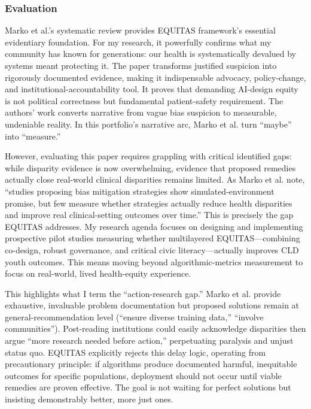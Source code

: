 \documentclass[11pt,twoside]{article}
\begin{document}
\vspace{-0.3cm}

\subsubsection*{Evaluation}

\vspace{-0.3cm}

Marko et al.'s systematic review provides EQUITAS framework's essential evidentiary foundation. For my research, it powerfully confirms what my community has known for generations: our health is systematically devalued by systems meant protecting it. The paper transforms justified suspicion into rigorously documented evidence, making it indispensable advocacy, policy-change, and institutional-accountability tool. It proves that demanding AI-design equity is not political correctness but fundamental patient-safety requirement. The authors' work converts narrative from vague bias suspicion to measurable, undeniable reality. In this portfolio's narrative arc, Marko et al. turn ``maybe'' into ``measure.''

However, evaluating this paper requires grappling with critical identified gaps: while disparity evidence is now overwhelming, evidence that proposed remedies actually close real-world clinical disparities remains limited. As Marko et al. note, ``studies proposing bias mitigation strategies show simulated-environment promise, but few measure whether strategies actually reduce health disparities and improve real clinical-setting outcomes over time.'' This is precisely the gap EQUITAS addresses. My research agenda focuses on designing and implementing prospective pilot studies measuring whether multilayered EQUITAS---combining co-design, robust governance, and critical civic literacy---actually improves CLD youth outcomes. This means moving beyond algorithmic-metrics measurement to focus on real-world, lived health-equity experience.

This highlights what I term the ``action-research gap.'' Marko et al. provide exhaustive, invaluable problem documentation but proposed solutions remain at general-recommendation level (``ensure diverse training data,'' ``involve communities''). Post-reading institutions could easily acknowledge disparities then argue ``more research needed before action,'' perpetuating paralysis and unjust status quo. EQUITAS explicitly rejects this delay logic, operating from precautionary principle: if algorithms produce documented harmful, inequitable outcomes for specific populations, deployment should not occur until viable remedies are proven effective. The goal is not waiting for perfect solutions but insisting demonstrably better, more just ones.
\end{document}
